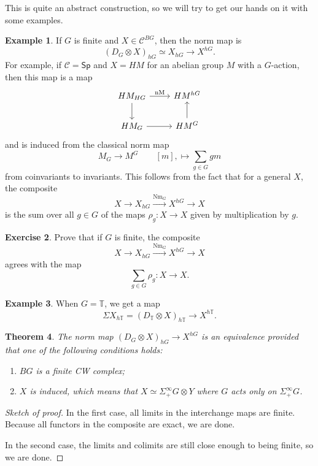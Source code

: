 \documentclass[10pt, oneside]{memoir}
\newtheorem{thm}{Theorem}[subsection]
\theoremstyle{definition}
\newtheorem{exm}[thm]{Example}
\newtheorem{exer}[thm]{Exercise}
\theoremstyle{remark}
\theoremstyle{plain}
\theoremstyle{definition}
\theoremstyle{remark}
\newcommand{\mc}[1]{\mathcal{#1}}
\newcommand{\T}{\mathbb{T}}
\newcommand{\mr}[1]{\mathrm{#1}}
\newcommand{\ms}[1]{\mathsf{#1}}
\newcommand{\1}{\mathbf{1}}
\newcommand{\2}{\mathbf{2}}
\newcommand{\3}{\mathbf{3}}
\begin{document}
This is quite an abstract construction, so we will try to get our hands on it with some examples.

\begin{exm}
    If \(G \) is finite and \(X \in \mc{C}^{BG} \), then the norm map is
    \[ (D_G \otimes X)_{hG} \simeq X_{hG} \to X^{hG}. \]
    For example, if \(\mc{C} = \ms{Sp} \) and \(X = HM \) for an abelian group \(M \) with a \(G \)-action, then this map is a map
    \begin{equation*}
    \begin{tikzcd}
        HM_{HG} \ar{r}{\mr{nM}} \ar{d} & HM^{hG} \\
        H M_G \ar{r} & H M^G \ar{u}
    \end{tikzcd}
    \end{equation*}
    and is induced from the classical norm map
    \[ M_G \to M^G \qquad [m], \mapsto \sum_{g \in G} gm \]
    from coinvariants to invariants.
    This follows from the fact that for a general \(X \), the composite
    \[ X \to X_{hG} \xrightarrow{\mr{Nm}_G} X^{hG} \to X \]
    is the sum over all \(g \in G \) of the maps \(\rho_g \colon X \to X \) given by multiplication by \(g \).
\end{exm}

\begin{exer}
    Prove that if \(G \) is finite, the composite
    \[ X \to X_{hG} \xrightarrow{\mr{Nm}_G} X^{hG} \to X \]
    agrees with the map
    \[ \sum_{g \in G} \rho_g \colon X \to X. \]
\end{exer}

\begin{exm}
    When \(G = \T \), we get a map
    \[ \Sigma X_{h\T} = (D_{\T} \otimes X)_{h\T} \to X^{h\T}. \]
\end{exm}

\begin{thm}
    The norm map \((D_G \otimes X)_{hG} \to X^{hG} \) is an equivalence provided that one of the following conditions holds:
    \begin{enumerate}
        \item \(BG \) is a finite CW complex;
        \item \(X \) is induced, which means that \(X \simeq \Sigma_+^{\infty} G \otimes Y \) where \(G \) acts only on \(\Sigma_+^{\infty} G \).
    \end{enumerate}
\end{thm}

\begin{proof}[Sketch of proof]
    In the first case, all limits in the interchange maps are finite. Because all functors in the composite are exact, we are done.

    In the second case, the limits and colimits are still close enough to being finite, so we are done.
\end{proof}
\end{document}

